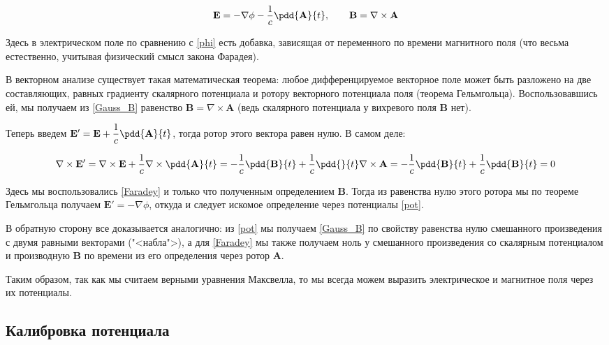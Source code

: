 \documentclass[12pt]{kiarticle}
\begin{document}
\begin{equation}\label{pot}
\mathbf{E} = - \nabla \phi  - \dfrac{1}{c} \pdd{\mathbf{A}}{t}, \qquad \mathbf{B} = \nabla \times \mathbf{A}
\end{equation}

Здесь в электрическом поле по сравнению с \eqref{phi} есть добавка, зависящая от переменного по времени магнитного поля (что весьма естественно, учитывая физический смысл закона Фарадея).

В векторном анализе существует такая математическая теорема: любое дифференцируемое векторное поле может быть разложено на две составляющих, равных градиенту скалярного потенциала и ротору векторного потенциала поля (теорема Гельмгольца). Воспользовавшись ей, мы получаем из \eqref{Gauss_B} равенство $ \mathbf{B} = \nabla \times \mathbf{A} $ (ведь скалярного потенциала у вихревого поля $ \mathbf{B} $ нет). 

Теперь введем $ \mathbf{E}' = \mathbf{E} + \dfrac{1}{c} \pdd{\mathbf{A}}{t} $, тогда ротор этого вектора равен нулю. В самом деле:

\begin{equation}\label{}
\nabla \times \mathbf{E}' = \nabla \times \mathbf{E} + \dfrac{1}{c}\nabla \times \pdd{\mathbf{A}}{t} = -\dfrac{1}{c} \pdd{\mathbf{B}}{t} +   \dfrac{1}{c}\pdd{}{t} \nabla \times \mathbf{A} =  -\dfrac{1}{c} \pdd{\mathbf{B}}{t} + \dfrac{1}{c} \pdd{\mathbf{B}}{t} = 0
\end{equation}

Здесь мы воспользовались \eqref{Faradey} и только что полученным определением $ \mathbf{B} $. Тогда из равенства нулю этого ротора мы по теореме Гельмгольца получаем $ \mathbf{E}' = - \nabla \phi $, откуда и следует искомое определение через потенциалы \eqref{pot}.

В обратную сторону все доказывается аналогично: из \eqref{pot} мы получаем \eqref{Gauss_B} по свойству равенства нулю смешанного произведения с двумя равными векторами ("<набла">), а для  \eqref{Faradey} мы также получаем ноль у смешанного произведения со скалярным потенциалом и производную $ \mathbf{B} $ по времени из его определения через ротор $ \mathbf{A} $.

Таким образом, так как мы считаем верными уравнения Максвелла, то мы всегда можем выразить электрическое и магнитное поля через их потенциалы.

\subsection{Калибровка потенциала}
\end{document}
